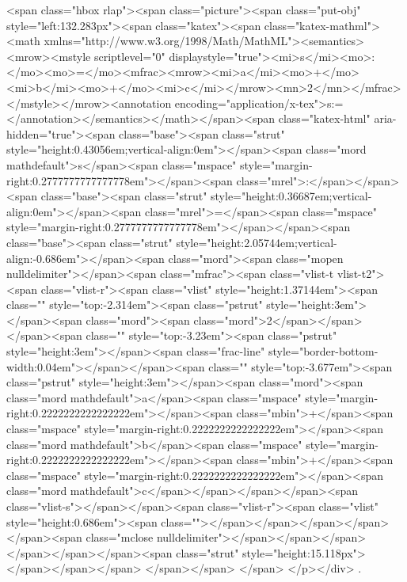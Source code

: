 <span class="hbox rlap"><span class="picture"><span class="put-obj" style="left:132.283px"><span class="katex"><span class="katex-mathml"><math xmlns="http://www.w3.org/1998/Math/MathML"><semantics><mrow><mstyle scriptlevel="0" displaystyle="true"><mi>s</mi><mo>:</mo><mo>=</mo><mfrac><mrow><mi>a</mi><mo>+</mo><mi>b</mi><mo>+</mo><mi>c</mi></mrow><mn>2</mn></mfrac></mstyle></mrow><annotation encoding="application/x-tex">\displaystyle s:=</annotation></semantics></math></span><span class="katex-html" aria-hidden="true"><span class="base"><span class="strut" style="height:0.43056em;vertical-align:0em"></span><span class="mord mathdefault">s</span><span class="mspace" style="margin-right:0.2777777777777778em"></span><span class="mrel">:</span></span><span class="base"><span class="strut" style="height:0.36687em;vertical-align:0em"></span><span class="mrel">=</span><span class="mspace" style="margin-right:0.2777777777777778em"></span></span><span class="base"><span class="strut" style="height:2.05744em;vertical-align:-0.686em"></span><span class="mord"><span class="mopen nulldelimiter"></span><span class="mfrac"><span class="vlist-t vlist-t2"><span class="vlist-r"><span class="vlist" style="height:1.37144em"><span class="" style="top:-2.314em"><span class="pstrut" style="height:3em"></span><span class="mord"><span class="mord">2</span></span></span><span class="" style="top:-3.23em"><span class="pstrut" style="height:3em"></span><span class="frac-line" style="border-bottom-width:0.04em"></span></span><span class="" style="top:-3.677em"><span class="pstrut" style="height:3em"></span><span class="mord"><span class="mord mathdefault">a</span><span class="mspace" style="margin-right:0.2222222222222222em"></span><span class="mbin">+</span><span class="mspace" style="margin-right:0.2222222222222222em"></span><span class="mord mathdefault">b</span><span class="mspace" style="margin-right:0.2222222222222222em"></span><span class="mbin">+</span><span class="mspace" style="margin-right:0.2222222222222222em"></span><span class="mord mathdefault">c</span></span></span></span><span class="vlist-s">​</span></span><span class="vlist-r"><span class="vlist" style="height:0.686em"><span class=""></span></span></span></span></span><span class="mclose nulldelimiter"></span></span></span></span></span></span><span class="strut" style="height:15.118px"></span></span></span>
</span></span>​ </span>
</p></div>
.